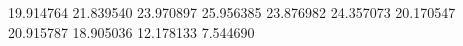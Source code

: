 19.914764
21.839540
23.970897
25.956385
23.876982
24.357073
20.170547
20.915787
18.905036
12.178133
7.544690
